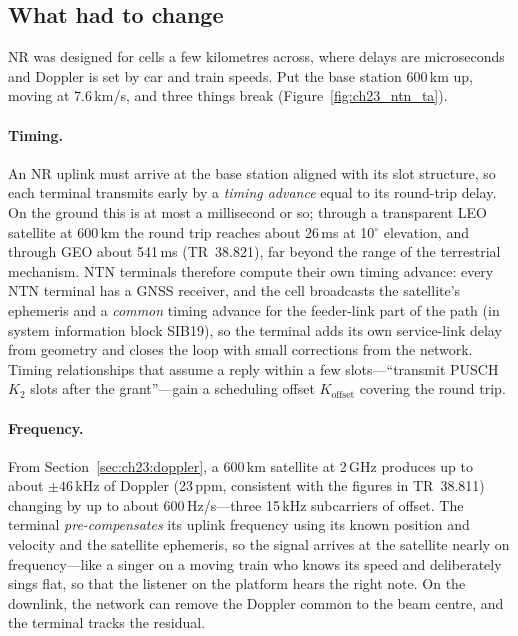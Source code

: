 \subsection{What had to change}

NR was designed for cells a few kilometres across, where delays are microseconds and Doppler is
set by car and train speeds. Put the base station 600\,km up, moving at 7.6\,km/s, and three
things break (Figure~\ref{fig:ch23_ntn_ta}).

\paragraph{Timing.} An NR uplink must arrive at the base station aligned with its slot structure,
so each terminal transmits early by a \emph{timing advance} equal to its round-trip delay. On the
ground this is at most a millisecond or so; through a transparent LEO satellite at 600\,km the
round trip reaches about 26\,ms at 10$^\circ$ elevation, and through GEO about 541\,ms (TR~38.821),
far beyond the range of the terrestrial mechanism. NTN terminals therefore compute their own
timing advance: every NTN terminal has a GNSS receiver, and the cell broadcasts the satellite's
ephemeris and a \emph{common} timing advance for the feeder-link part of the path (in system
information block SIB19), so the terminal adds its own service-link delay from geometry and
closes the loop with small corrections from the network. Timing relationships that assume a
reply within a few slots---``transmit PUSCH $K_2$ slots after the grant''---gain a
scheduling offset $K_{\text{offset}}$ covering the round trip.


\paragraph{Frequency.} From Section~\ref{sec:ch23:doppler}, a 600\,km satellite at 2\,GHz produces
up to about $\pm46$\,kHz of Doppler (23\,ppm, consistent with the figures in TR~38.811) changing by
up to about 600\,Hz/s---three 15\,kHz subcarriers of offset. The terminal \emph{pre-compensates}
its uplink frequency using its known position and velocity and the satellite ephemeris, so the
signal arrives at the satellite nearly on frequency---like a singer on a moving train who knows
its speed and deliberately sings flat, so that the listener on the platform hears the right
note. On the downlink, the network can remove the Doppler common to the beam centre, and the
terminal tracks the residual.

